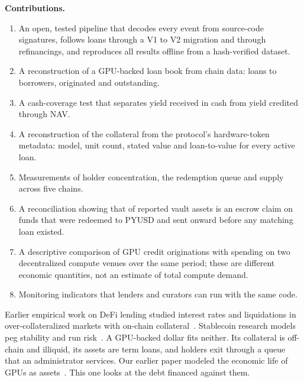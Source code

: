 \textbf{Contributions.}
\begin{enumerate}
\item An open, tested pipeline that decodes every event from source-code signatures, follows loans through a V1 to V2 migration and through refinancings, and reproduces all results offline from a hash-verified dataset.
\item A reconstruction of a GPU-backed loan book from chain data: \NLoans{} loans to \NBorrowers{} borrowers, \Originated{} originated and \Outstanding{} outstanding.
\item A cash-coverage test that separates yield received in cash from yield credited through NAV.
\item A reconstruction of the collateral from the protocol's hardware-token metadata: model, unit count, stated value and loan-to-value for every active loan.
\item Measurements of holder concentration, the redemption queue and supply across five chains.
\item A reconciliation showing that \DTShare{} of reported vault assets is an escrow claim on funds that were redeemed to PYUSD and sent onward before any matching loan existed.
\item A descriptive comparison of GPU credit originations with spending on two decentralized compute venues over the same period; these are different economic quantities, not an estimate of total compute demand.
\item Monitoring indicators that lenders and curators can run with the same code.
\end{enumerate}

Earlier empirical work on DeFi lending studied interest rates and liquidations in over-collateralized markets with on-chain collateral~\cite{gudgeon2020defi,qin2021liquidations,werner2022sok}. Stablecoin research models peg stability and run risk~\cite{klagesmundt2020stablecoins,gorton2023wildcat,diamond1983runs}. A GPU-backed dollar fits neither. Its collateral is off-chain and illiquid, its assets are term loans, and holders exit through a queue that an administrator services. Our earlier paper modeled the economic life of GPUs as assets~\cite{cerron2026gpu}. This one looks at the debt financed against them.
